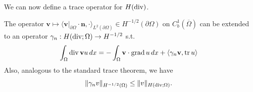 \documentclass[../master_thesis.tex]{subfiles}
\begin{document}
We can now define a trace operator for $H(\operatorname{div})$.
\begin{theorem}\label{thm:trace_of_hdiv}
    The operator $\mathbf{v} \mapsto \langle \mathbf{v}|_{\partial \Omega} \cdot \mathbf{n}, \cdot
    \rangle_{L^2(\partial \Omega)} \in H^{-1/2}(\partial\Omega)$
    on $C^1_b(\overline{\Omega})$ can be extended to an operator 
    $\gamma_n: H(\operatorname{div};\Omega) \rightarrow H^{-1/2}$ s.t.
    \begin{align*}
        \int_\Omega \operatorname{div} \mathbf{v} u \, dx 
        = -\int_\Omega \mathbf{v} \cdot \operatorname{grad} u \, dx + \langle \gamma_n \mathbf{v}, \operatorname{tr} u \rangle
    \end{align*}
    Also, analogous to the standard trace theorem, we have
    \begin{align*}
        \lVert \gamma_n v \rVert _{H^{-1/2}(\Omega)} 
        \leq     \lVert v \rVert _{H(\operatorname{div}; \Omega)}.
    \end{align*}
\end{theorem}
\end{document}
